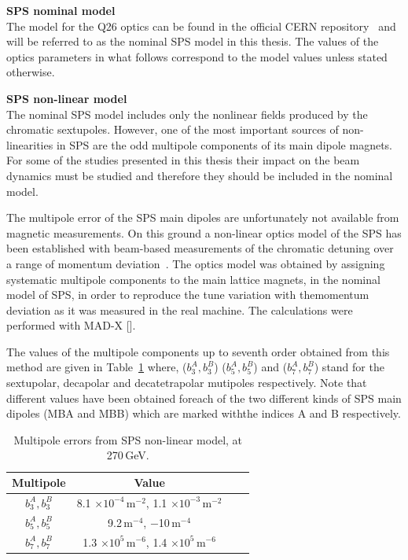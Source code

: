  \normalsize{\textbf{SPS nominal model}\\
 The model for the Q26 optics can be found in the official CERN repository~\cite{SPS_optics_repo} and will be referred to as the nominal SPS model in this thesis. The values of the optics parameters in what follows correspond to the model values unless stated otherwise.

 \normalsize{\textbf{SPS non-linear model}\\
The nominal SPS model includes only the nonlinear fields produced by the chromatic sextupoles. However, one of the most important sources of non-linearities in SPS are the odd multipole components of its main dipole magnets. For some of the studies presented in this thesis their impact on the beam dynamics must be studied and therefore they should be included in the nominal model. 

The multipole error of the SPS main dipoles are unfortunately not available from magnetic measurements. On this ground a non-linear optics model of the SPS has been established with beam-based measurements of the chromatic detuning over a range of momentum deviation~\cite{Carlà:2664976, Alekou:2640326}.  The optics model was obtained by assigning systematic multipole components to the main lattice magnets, in the nominal model of SPS, in order to reproduce the tune variation with themomentum deviation as it was measured in the real machine. The calculations were performed with MAD-X [].

The values of the multipole components up to seventh order obtained from this method are given in Table~\ref{tab:sps_mult_270GeV} where, ($b_3^A, b_3^B$) ($b_5^A, b_5^B$) and ($b_7^A, b_7^B$) stand for the sextupolar, decapolar and decatetrapolar mutipoles respectively. Note that different values have been obtained foreach of the two different kinds of SPS main dipoles (MBA and MBB) which are marked withthe indices A and B respectively.

\begin{table}[ht] %
    \caption{Multipole errors from SPS non-linear model, at 270\,GeV.} %
    \centering %
    \begin{tabular}{c c c c} %
    \hline\hline %
    Multipole & Value  \\ [0.5ex] %
    \hline  %
    $b_3^A, b_3^B$ & 8.1 $\times 10^{-4}$\,$\mathrm{m^{-2}}$, 1.1 $\times 10^{-3}$\,$\mathrm{m^{-2}}$\\ 
    $b_5^A, b_5^B$ & 9.2\,$\mathrm{m^{-4}}$, $-$10\,$\mathrm{m^{-4}}$ \\
    $b_7^A, b_7^B$ & 1.3 $\times 10^{5}$\,$\mathrm{m^{-6}}$, 1.4 $\times 10^{5}$\,$\mathrm{m^{-6}}$\\ [1ex] %
    \hline %
    \end{tabular}
    \label{tab:sps_mult_270GeV} %
    \end{table}


}}
